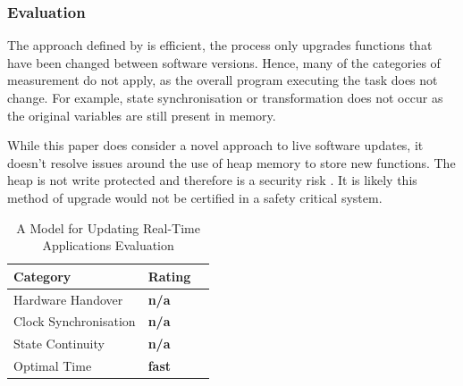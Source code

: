 \subsubsection{Evaluation}
The approach defined by \textcite{montgomeryModelUpdatingRealTime2004} is efficient, the process only upgrades functions that have been changed between software versions. Hence, many of the categories of measurement do not apply, as the overall program executing the task does not change. For example, state synchronisation or transformation does not occur as the original variables are still present in memory.

While this paper does consider a novel approach to live software updates, it doesn't resolve issues around the use of heap memory to store new functions. The heap is not write protected and therefore is a security risk \autocite{montgomeryModelUpdatingRealTime2004}. It is likely this method of upgrade would not be certified in a safety critical system.


\begin{table}[ht]
    \centering
    \begin{tabular}{lll}
    Category & Rating \\ \hline
    Hardware Handover & \textbf{n/a} \\
    Clock Synchronisation & \textbf{n/a} \\
    State Continuity & \textbf{n/a} \\
    Optimal Time & \textbf{fast}
    \end{tabular}
    \caption[A Model for Updating Real-Time Applications Evaluation]
    {A Model for Updating Real-Time Applications Evaluation}
    \label{tbl:montgomeryModelUpdatingRealTime2004}
\end{table}